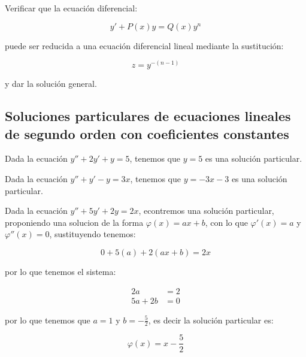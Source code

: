 		\begin{ejemplo}
		\end{ejemplo}

		\begin{ejercicio}
			Verificar que la ecuación diferencial:

			\begin{equation*}
				y' + P(x) y = Q(x) y^n
			\end{equation*}

			puede ser reducida a una ecuación diferencial lineal mediante la sustitución:

			\begin{equation*}
				z = y^{-(n-1)}
			\end{equation*}

			y dar la solución general.
		\end{ejercicio}

	\newpage
	\subsection{Soluciones particulares de ecuaciones lineales de segundo orden con coeficientes constantes}

		\begin{ejemplo}
			Dada la ecuación $y'' + 2 y' + y = 5$, tenemos que $y = 5$ es una solución particular.
		\end{ejemplo}

		\begin{ejemplo}
			Dada la ecuación $y'' + y' - y = 3x$, tenemos que $y = -3x - 3$ es una solución particular.
		\end{ejemplo}
		

		\begin{ejemplo}
			Dada la ecuación $y'' + 5 y' + 2 y = 2 x$, econtremos una solución particular, proponiendo una solucion de la forma $\varphi(x) = a x + b$, con lo que $\varphi'(x) = a$ y $\varphi''(x) = 0$, sustituyendo tenemos:

			\begin{equation*}
				0 + 5 (a) + 2 (a x + b) = 2 x
			\end{equation*}

			por lo que tenemos el sistema:

			\begin{align*}
				2a &= 2 \\
				5a + 2b &= 0
			\end{align*}

			por lo que tenemos que $a = 1$ y $b = - \frac{5}{2}$, es decir la solución particular es:

			\begin{equation*}
				\varphi(x) = x - \frac{5}{2}
			\end{equation*}
		\end{ejemplo}

